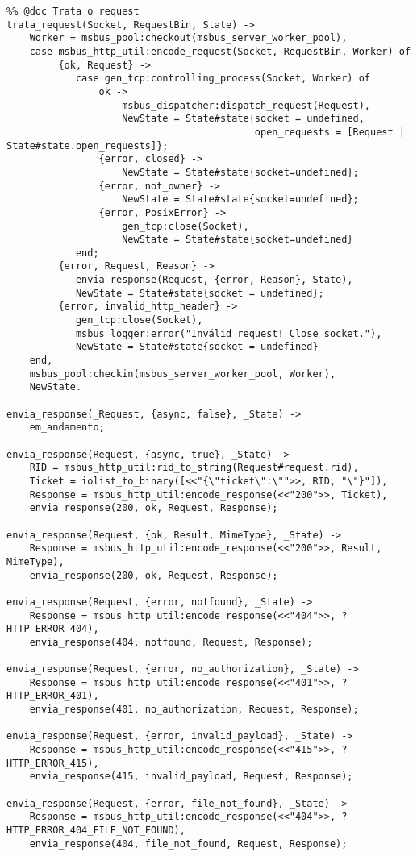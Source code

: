 \begin{lstlisting}
%% @doc Trata o request
trata_request(Socket, RequestBin, State) -> 
	Worker = msbus_pool:checkout(msbus_server_worker_pool),
	case msbus_http_util:encode_request(Socket, RequestBin, Worker) of
		 {ok, Request} -> 
			case gen_tcp:controlling_process(Socket, Worker) of
				ok -> 
					msbus_dispatcher:dispatch_request(Request),
					NewState = State#state{socket = undefined, 
										   open_requests = [Request | State#state.open_requests]};
				{error, closed} -> 
					NewState = State#state{socket=undefined};
				{error, not_owner} -> 
					NewState = State#state{socket=undefined};
				{error, PosixError} ->
					gen_tcp:close(Socket),
					NewState = State#state{socket=undefined}
			end;
		 {error, Request, Reason} -> 
			envia_response(Request, {error, Reason}, State),
			NewState = State#state{socket = undefined};
		 {error, invalid_http_header} -> 
			gen_tcp:close(Socket),
			msbus_logger:error("Inválid request! Close socket."),
			NewState = State#state{socket = undefined}
	end,
	msbus_pool:checkin(msbus_server_worker_pool, Worker),
	NewState.

envia_response(_Request, {async, false}, _State) -> 
	em_andamento;

envia_response(Request, {async, true}, _State) ->
	RID = msbus_http_util:rid_to_string(Request#request.rid),
	Ticket = iolist_to_binary([<<"{\"ticket\":\"">>, RID, "\"}"]),
	Response = msbus_http_util:encode_response(<<"200">>, Ticket),
	envia_response(200, ok, Request, Response);

envia_response(Request, {ok, Result, MimeType}, _State) ->
	Response = msbus_http_util:encode_response(<<"200">>, Result, MimeType),
	envia_response(200, ok, Request, Response);

envia_response(Request, {error, notfound}, _State) ->
	Response = msbus_http_util:encode_response(<<"404">>, ?HTTP_ERROR_404),
	envia_response(404, notfound, Request, Response);

envia_response(Request, {error, no_authorization}, _State) ->
	Response = msbus_http_util:encode_response(<<"401">>, ?HTTP_ERROR_401),
	envia_response(401, no_authorization, Request, Response);

envia_response(Request, {error, invalid_payload}, _State) ->
	Response = msbus_http_util:encode_response(<<"415">>, ?HTTP_ERROR_415),
	envia_response(415, invalid_payload, Request, Response);

envia_response(Request, {error, file_not_found}, _State) ->
	Response = msbus_http_util:encode_response(<<"404">>, ?HTTP_ERROR_404_FILE_NOT_FOUND),
	envia_response(404, file_not_found, Request, Response);


\end{lstlisting}
